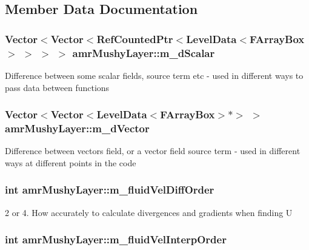 \subsection{Member Data Documentation}
\hypertarget{classamr_mushy_layer_af1edd977e248b432f8395bd9c8e8af4f}{
\subsubsection[{m\-\_\-d\-Scalar}]{\setlength{\rightskip}{0pt plus 5cm}Vector$<$Vector$<$Ref\-Counted\-Ptr$<$Level\-Data$<$F\-Array\-Box$>$ $>$ $>$ $>$ amr\-Mushy\-Layer\-::m\-\_\-d\-Scalar\hspace{0.3cm}{\ttfamily [protected]}}}\label{classamr_mushy_layer_af1edd977e248b432f8395bd9c8e8af4f}
Difference between some scalar fields, source term etc -\/ used in different ways to pass data between functions \hypertarget{classamr_mushy_layer_a968557aafa369bfa973d63e07557a551}{
\subsubsection[{m\-\_\-d\-Vector}]{\setlength{\rightskip}{0pt plus 5cm}Vector$<$Vector$<$Level\-Data$<$F\-Array\-Box$>$$\ast$$>$ $>$ amr\-Mushy\-Layer\-::m\-\_\-d\-Vector\hspace{0.3cm}{\ttfamily [protected]}}}\label{classamr_mushy_layer_a968557aafa369bfa973d63e07557a551}
Difference between vectors field, or a vector field source term -\/ used in different ways at different points in the code \hypertarget{classamr_mushy_layer_adca557c16f43ad73fcb91bc1b05b6862}{
\subsubsection[{m\-\_\-fluid\-Vel\-Diff\-Order}]{\setlength{\rightskip}{0pt plus 5cm}int amr\-Mushy\-Layer\-::m\-\_\-fluid\-Vel\-Diff\-Order\hspace{0.3cm}{\ttfamily [protected]}}}\label{classamr_mushy_layer_adca557c16f43ad73fcb91bc1b05b6862}
2 or 4. How accurately to calculate divergences and gradients when finding U \hypertarget{classamr_mushy_layer_a161be4ad2be61ff80d97834ac501a080}{
\subsubsection[{m\-\_\-fluid\-Vel\-Interp\-Order}]{\setlength{\rightskip}{0pt plus 5cm}int amr\-Mushy\-Layer\-::m\-\_\-fluid\-Vel\-Interp\-Order\hspace{0.3cm}{\ttfamily [protected]}}}\label{classamr_mushy_layer_a161be4ad2be61ff80d97834ac501a080}
